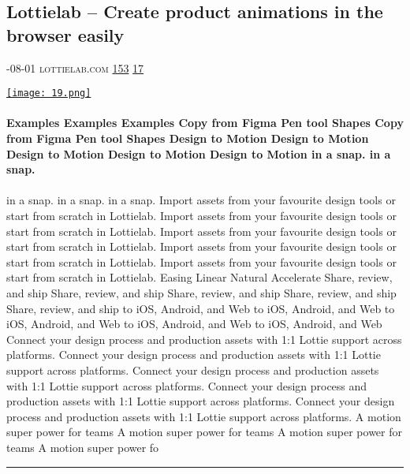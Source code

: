 \documentclass[10pt,a4paper]{article}
\begin{document}
\begin{multicols*}{2}
\begin{minipage}{\linewidth}
\subsection{Lottielab – Create product animations in the browser easily}
\textsc{\footnotesize
{\scriptsize\faCalendar}-08-01 
{\scriptsize\faGlobe}\space 
lottielab.com 
{\scriptsize\faThumbsOUp}\space 
\href{http://news.ycombinator.com/item?id=37133128\&utm\_term=comment}{153} 
{\scriptsize\faComments}\space 
\href{http://news.ycombinator.com/item?id=37133128\&utm\_term=comment}{17} 
}
\par\medskip\noindent
\href{https://www.lottielab.com/?utm\_source=hackernewsletter\&utm\_medium=email\&utm\_term=show\_hn}{
    \texttt{[image: 19.png]}
}
\end{minipage}
\paragraph{}
\textbf{Examples
Examples
Examples
Copy from Figma
Pen tool
Shapes
Copy from Figma
Pen tool
Shapes
Design to Motion
Design to Motion
Design to Motion
Design to Motion
Design to Motion
in a snap.
in a snap.}
\paragraph{}

in a snap.
in a snap.
in a snap.
Import assets from your favourite design tools or start from scratch in Lottielab.
Import assets from your favourite design tools or start from scratch in Lottielab.
Import assets from your favourite design tools or start from scratch in Lottielab.
Import assets from your favourite design tools or start from scratch in Lottielab.
Import assets from your favourite design tools or start from scratch in Lottielab.
Easing
Linear
Natural
Accelerate
Share, review, and ship
Share, review, and ship
Share, review, and ship
Share, review, and ship
Share, review, and ship
to iOS, Android, and Web
to iOS, Android, and Web
to iOS, Android, and Web
to iOS, Android, and Web
to iOS, Android, and Web
Connect your design process and production assets with 1:1 Lottie support across platforms.
Connect your design process and production assets with 1:1 Lottie support across platforms.
Connect your design process and production assets with 1:1 Lottie support across platforms.
Connect your design process and production assets with 1:1 Lottie support across platforms.
Connect your design process and production assets with 1:1 Lottie support across platforms.
A motion super power for teams
A motion super power for teams
A motion super power for teams
A motion super power fo
\par\noindent\textcolor{red}{\rule{\linewidth}{0.2mm}}
\vfill
\null
\noindent\begin{minipage}{\linewidth}

\end{minipage}
\end{multicols*}
\end{document}
